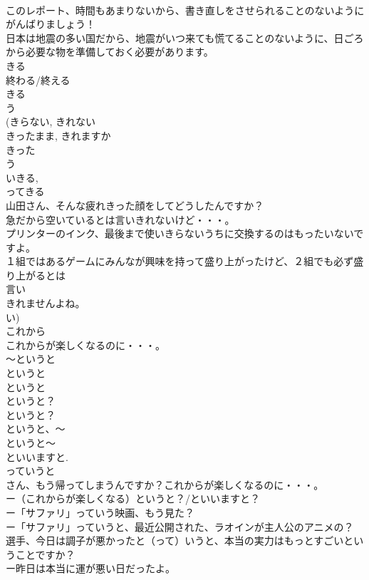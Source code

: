\documentclass[8pt]{extreport}
\begin{document}
\begin{CJK}{UTF8}{min}
\\	このレポート、時間もあまりないから、書き直しをさせられることのないようにがんばりましょう！
\\	日本は地震の多い国だから、地震がいつ来ても慌てることのないように、日ごろから必要な物を準備しておく必要があります。	
\\	きる
\\	終わる/終える 
\\	きる 
\\	う
\\	(きらない, きれない
\\	きったまま, きれますか
\\	きった
\\	う
\\	いきる, 
\\	ってきる
\\	山田さん、そんな疲れきった顔をしてどうしたんですか？
\\	急だから空いているとは言いきれないけど・・・。
\\	プリンターのインク、最後まで使いきらないうちに交換するのはもったいないですよ。
\\	１組ではあるゲームにみんなが興味を持って盛り上がったけど、２組でも必ず盛り上がるとは
\\	言い
\\	きれませんよね。　
\\	い)	
\\	これから
\\	これからが楽しくなるのに・・・。
\\	～というと
\\	というと
\\	というと 
\\	というと？ 
\\	というと？
\\	というと、～
\\	というと～ 
\\	といいますと. 
\\	っていうと
\\	さん、もう帰ってしまうんですか？これからが楽しくなるのに・・・。
\\	ー（これからが楽しくなる）というと？/といいますと？
\\	ー「サファリ」っていう映画、もう見た？
\\	ー「サファリ」っていうと、最近公開された、ラオインが主人公のアニメの？
\\	選手、今日は調子が悪かったと（って）いうと、本当の実力はもっとすごいということですか？
\\	ー昨日は本当に運が悪い日だったよ。

\end{CJK}
\end{document}
